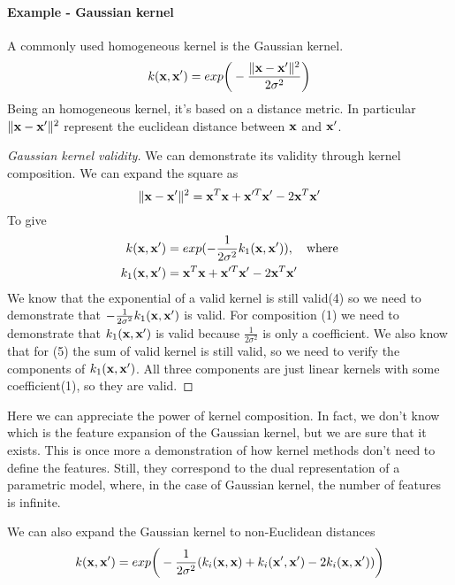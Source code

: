 \documentclass[main.tex]{subfiles}
\begin{document}
\paragraph{Example - Gaussian kernel} A commonly used homogeneous kernel is the Gaussian kernel.
\begin{equation}
    k(\textbf{x},\textbf{x}') = exp \bigg(-\frac{\|\textbf{x}-\textbf{x}'\|^2}{2\sigma^2} \bigg)
\end{equation}
Being an homogeneous kernel, it's based on a distance metric. In particular $\|\textbf{x}-\textbf{x}'\|^2$ represent the euclidean distance between $\textbf{x}$ and $\textbf{x}'$.
\begin{proof}[Gaussian kernel validity]
We can demonstrate its validity through kernel composition.
We can expand the square as
\begin{equation*}
    \|\textbf{x}-\textbf{x}'\|^2 = \textbf{x}^T \textbf{x} + \textbf{x}'^T \textbf{x}' - 2 \textbf{x}^T \textbf{x}'
\end{equation*}
To give
\begin{align*}
    k(\textbf{x},\textbf{x}') &= exp(-\frac{1}{2\sigma^2} k_1(\textbf{x},\textbf{x}')), \quad \text{where} \\
    k_1(\textbf{x},\textbf{x}') &= \textbf{x}^T \textbf{x} + \textbf{x}'^T \textbf{x}' - 2 \textbf{x}^T \textbf{x}'
\end{align*}
We know that the exponential of a valid kernel is still valid(4) so we need to demonstrate that $-\frac{1}{2\sigma^2}k_1(\textbf{x},\textbf{x}')$ is valid.
For composition (1) we need to demonstrate that $k_1(\textbf{x},\textbf{x}')$ is valid because $\frac{1}{2\sigma^2}$ is only a coefficient. We also know that for (5) the sum of valid kernel is still valid, so we need to verify the components of $k_1(\textbf{x},\textbf{x}')$. All three components are just linear kernels with some coefficient(1), so they are valid.
\end{proof}
Here we can appreciate the power of kernel composition. In fact, we don't know which is the feature expansion of the Gaussian kernel, but we are sure that it exists. This is once more a demonstration of how kernel methods don't need to define the features. Still, they correspond to the dual representation of a parametric model, where, in the case of Gaussian kernel, the number of features is infinite.

We can also expand the Gaussian kernel to non-Euclidean distances
\begin{equation}
    k(\textbf{x},\textbf{x}') = exp\bigg( -\frac{1}{2\sigma^2}(k_i(\textbf{x},\textbf{x}) + k_i(\textbf{x}',\textbf{x}') - 2k_i(\textbf{x},\textbf{x}'))  \bigg)
\end{equation}
\end{document}
